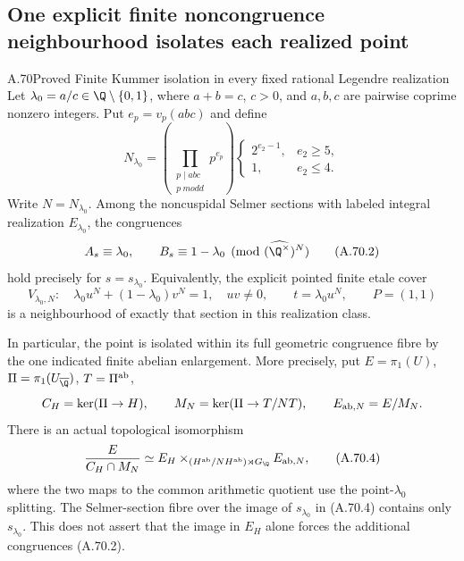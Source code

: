 \subsection{One explicit finite noncongruence neighbourhood isolates each realized point}

\begin{statement}{A.70}{Proved}
{Finite Kummer isolation in every fixed rational Legendre realization}
Let $\lambda_0=a/c\in\Q\setminus\{0,1\}$, where
$a+b=c$, $c>0$, and $a,b,c$ are pairwise coprime nonzero
integers.  Put $e_p=v_p(abc)$ and define
\[
 N_{\lambda_0}=
 \left(\prod_{\substack{p\mid abc\\p\ {
m odd}}}p^{e_p}\right)
 \begin{cases}
       2^{e_2-1},&e_2\ge5,\\
       1,&e_2\le4.
 \end{cases}
\tag{A.70.1}
\]
Write $N=N_{\lambda_0}$.
Among the noncuspidal Selmer sections with labeled integral
realization $E_{\lambda_0}$, the congruences
\[
             A_s\equiv\lambda_0,\qquad
             B_s\equiv1-\lambda_0
                       \pmod{(\widehat{\Q^\times})^N}
\tag{A.70.2}
\]
hold precisely for $s=s_{\lambda_0}$.
Equivalently, the explicit pointed finite etale cover
\[
 V_{\lambda_0,N}:\quad
       \lambda_0u^N+(1-\lambda_0)v^N=1,\quad uv\ne0,
 \qquad t=\lambda_0u^N,\qquad P=(1,1)
\tag{A.70.3}
\]
is a neighbourhood of exactly that section in this
realization class.

In particular, the point is isolated within its full
geometric congruence fibre by the one indicated finite
abelian enlargement.  More precisely, put
$E=\pi_1(U)$, $\Pi=\pi_1(U_{\overline\Q})$,
$T=\Pi^{\rm ab}$,
\[
 C_H=\ker(\Pi\to H),\qquad
 M_N=\ker(\Pi\to T/NT),\qquad
 E_{{\rm ab},N}=E/M_N.
\]
There is an actual topological isomorphism
\[
 \frac{E}{C_H\cap M_N}
       \simeq
 E_H\mathbin{\times}_{(H^{\rm ab}/NH^{\rm ab})\rtimes G_\Q}
                         E_{{\rm ab},N},
\tag{A.70.4}
\]
where the two maps to the common arithmetic quotient use
the point-$\lambda_0$ splitting.
The Selmer-section fibre over the image of $s_{\lambda_0}$
in (A.70.4) contains only $s_{\lambda_0}$.
This does not assert that the image in $E_H$ alone forces
the additional congruences (A.70.2).
\end{statement}
